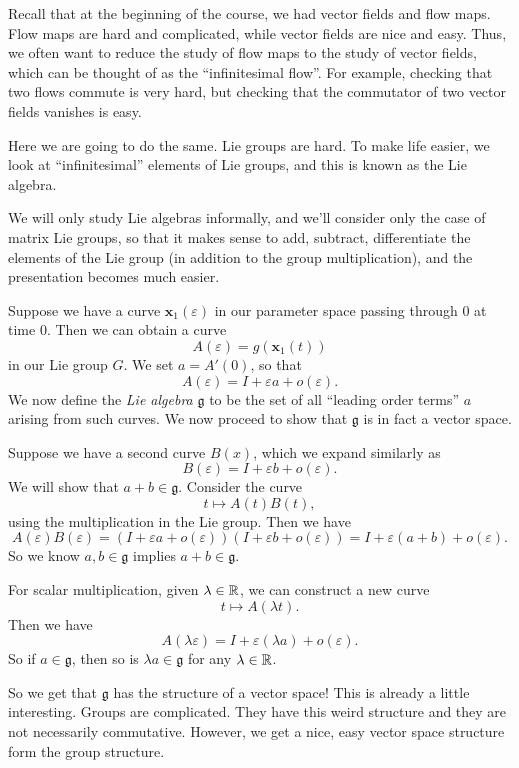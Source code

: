 \documentclass[a4paper]{article}
\begin{document}
Recall that at the beginning of the course, we had vector fields and flow maps. Flow maps are hard and complicated, while vector fields are nice and easy. Thus, we often want to reduce the study of flow maps to the study of vector fields, which can be thought of as the ``infinitesimal flow''. For example, checking that two flows commute is very hard, but checking that the commutator of two vector fields vanishes is easy.

Here we are going to do the same. Lie groups are hard. To make life easier, we look at ``infinitesimal'' elements of Lie groups, and this is known as the Lie algebra.

We will only study Lie algebras informally, and we'll consider only the case of matrix Lie groups, so that it makes sense to add, subtract, differentiate the elements of the Lie group (in addition to the group multiplication), and the presentation becomes much easier.

Suppose we have a curve $\mathbf{x}_1(\varepsilon)$ in our parameter space passing through $0$ at time $0$. Then we can obtain a curve
\[
  A(\varepsilon) = g(\mathbf{x}_1(t))
\]
in our Lie group $G$. We set $a = A'(0)$, so that
\[
  A(\varepsilon) = I + \varepsilon a + o(\varepsilon).
\]
We now define the \emph{Lie algebra} $\mathfrak{g}$ to be the set of all ``leading order terms'' $a$ arising from such curves. We now proceed to show that $\mathfrak{g}$ is in fact a vector space.

Suppose we have a second curve $B(x)$, which we expand similarly as
\[
  B(\varepsilon) = I + \varepsilon b + o (\varepsilon).
\]
We will show that $a + b \in \mathfrak{g}$. Consider the curve
\[
  t \mapsto A(t) B(t),
\]
using the multiplication in the Lie group. Then we have
\[
  A(\varepsilon)B(\varepsilon) = (I + \varepsilon a + o(\varepsilon)) (I + \varepsilon b + o(\varepsilon)) = I + \varepsilon(a + b) + o (\varepsilon).
\]
So we know $a, b \in \mathfrak{g}$ implies $a + b \in \mathfrak{g}$.

For scalar multiplication, given $\lambda \in \mathbb{R}$, we can construct a new curve
\[
  t \mapsto A(\lambda t).
\]
Then we have
\[
  A(\lambda \varepsilon) = I + \varepsilon (\lambda a) + o(\varepsilon).
\]
So if $a \in \mathfrak{g}$, then so is $\lambda a \in \mathfrak{g}$ for any $\lambda \in \mathbb{R}$.

So we get that $\mathfrak{g}$ has the structure of a vector space! This is already a little interesting. Groups are complicated. They have this weird structure and they are not necessarily commutative. However, we get a nice, easy vector space structure form the group structure.
\end{document}
